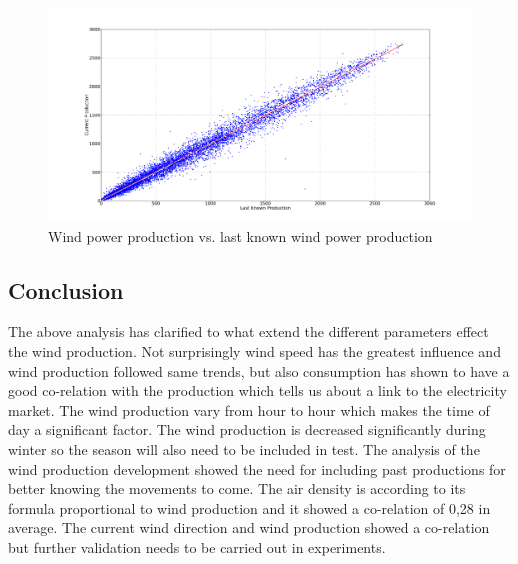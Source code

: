 \begin{figure}[H]
\centering
\includegraphics[width=0.99\linewidth,natwidth=898,natheight=587]{billeder/windProductionVsLastWindProduction.png}
\caption{Wind power production vs. last known wind power production}
\label{fig:windProductionVsLastWindProduction}
\end{figure}

\subsection{Conclusion}
The above analysis has clarified to what extend the different parameters effect the wind production. Not surprisingly wind speed has the greatest influence and wind production followed same trends, but also consumption has shown to have a good co-relation with the production which tells us about a link to the electricity market. The wind production vary from hour to hour which makes the time of day a significant factor. The wind production is decreased significantly during winter so the season will also need to be included in test. The analysis of the wind production development showed the need for including past productions for better knowing the movements to come.
The air density is according to its formula proportional to wind production and it showed a co-relation of 0,28 in average. The current wind direction and wind production showed a co-relation but further validation needs to be carried out in experiments.